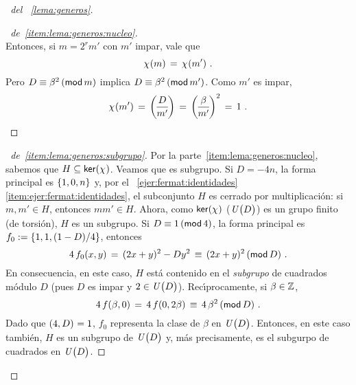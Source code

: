 \begin{proof}[\proofname~del \lemaname~\ref{lema:generos}]
\begin{proof}[\proofname~de~\ref{item:lema:generos:nucleo}]
\begin{displaymath}
		\end{displaymath}
		Entonces, si $m=2^r m'$ con $m'$ impar, vale que
		\begin{displaymath}
			\varkronecker(m)\,=\,\varkronecker(m')
			\dispstop
		\end{displaymath}
		Pero $D\equiv\beta^2\tmodulo[m]$ implica
		$D\equiv\beta^2\tmodulo[m']$. Como $m'$ es impar,
		\begin{displaymath}
			\varkronecker(m')\,=\,\jacobi D{m'}\,=\,
				\jacobi \beta{m'}^2\,=\,1
			\dispstop
		\end{displaymath}
	\end{proof}

	\begin{proof}[\proofname~de~\ref{item:lema:generos:subgrupo}]
		Por la parte~\ref{item:lema:generos:nucleo}, sabemos que
		$H\subseteq\ker(\varkronecker)$.
		Veamos que es subgrupo. Si $D=-4n$,
		la forma principal es $\binaria{1,0,n}$ y, por el
		\ejername~\ref{ejer:fermat:identidades}~%
		\eqref{item:ejer:fermat:identidades},
		el subconjunto $H$ es cerrado por multiplicaci\'on:
		si $m,m'\in H$, entonces $mm'\in H$. Ahora, como
		$\ker(\varkronecker)$ ($\Unidadesmod[D]$) es un grupo finito
		(de torsi\'on), $H$ es un subgrupo.
		Si $D\equiv 1\tmodulo[4]$, la forma principal es
		$f_0:=\binaria{1,1,(1-D)/4}$, entonces
		\begin{displaymath}
			4\,f_0(x,y)\,=\,(2x+y)^2-Dy^2\,\equiv\,
				(2x+y)^2\tmodulo[D]
			\dispstop
		\end{displaymath}
		En consecuencia, en este caso, $H$ est\'a contenido en
		el \emph{subgrupo} de cuadrados m\'odulo $D$
		(pues $D$ es impar y $2\in\Unidadesmod[D]$).
		Rec\'{\i}procamente, si $\beta\in\Enteros$,
		\begin{displaymath}
			4\,f(\beta,0)\,=\,4\,f(0,2\beta)\,\equiv\,
				4\,\beta^2\tmodulo[D]
			\dispstop
		\end{displaymath}
		Dado que $\mcd{4,D}=1$, $f_0$ representa la clase de
		$\beta$ en $\Unidadesmod[D]$. Entonces, en este caso
		tambi\'en, $H$ es un subgrupo de $\Unidadesmod[D]$ y,
		m\'as precisamente, es el subgurpo de cuadrados
		en $\Unidadesmod[D]$.
	\end{proof}


\end{proof}
